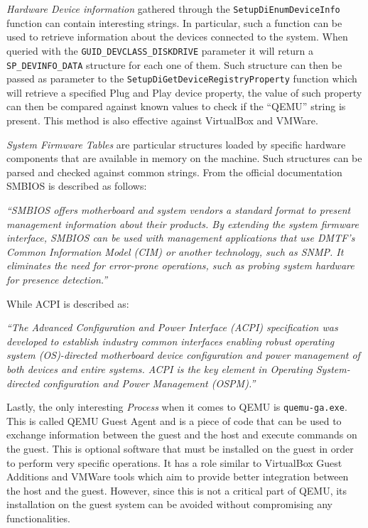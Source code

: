 \textit{Hardware Device information} gathered through the \lstinline{SetupDiEnumDeviceInfo} function can contain interesting strings. In particular, such a function can be used to retrieve information about the devices connected to the system. When queried with the \lstinline{GUID_DEVCLASS_DISKDRIVE} parameter it will return a \lstinline{SP_DEVINFO_DATA} structure for each one of them. Such structure can then be passed as parameter to the \lstinline{SetupDiGetDeviceRegistryProperty} function which will retrieve a specified Plug and Play device property, the value of such property can then be compared against known values to check if the ``QEMU'' string is present. This method is also effective against VirtualBox and VMWare.

\textit{System Firmware Tables} are particular structures loaded by specific hardware components that are available in memory on the machine. Such structures can be parsed and checked against common strings. From the official documentation SMBIOS is described as follows:

\textit{``SMBIOS offers motherboard and system vendors a standard format to present management information about their products. By extending the system firmware interface, SMBIOS can be used with management applications that use DMTF’s Common Information Model (CIM)  or another technology, such as SNMP. It eliminates the need for error-prone operations, such as probing system hardware for presence detection.''}~\cite{smbios}

While ACPI is described as:

\textit{``The Advanced Configuration and Power Interface (ACPI) specification was developed to establish industry common interfaces enabling robust operating system (OS)-directed motherboard device configuration and power management of both devices and entire systems.  ACPI is the key element in Operating System-directed configuration and Power Management (OSPM).''}~\cite{acpi}

Lastly, the only interesting \textit{Process} when it comes to QEMU is \lstinline{quemu-ga.exe}. This is called QEMU Guest Agent and is a piece of code that can be used to exchange information between the guest and the host and execute commands on the guest. This is optional software that must be installed on the guest in order to perform very specific operations. It has a role similar to VirtualBox Guest Additions and VMWare tools which aim to provide better integration between the host and the guest. However, since this is not a critical part of QEMU, its installation on the guest system can be avoided without compromising any functionalities.  

